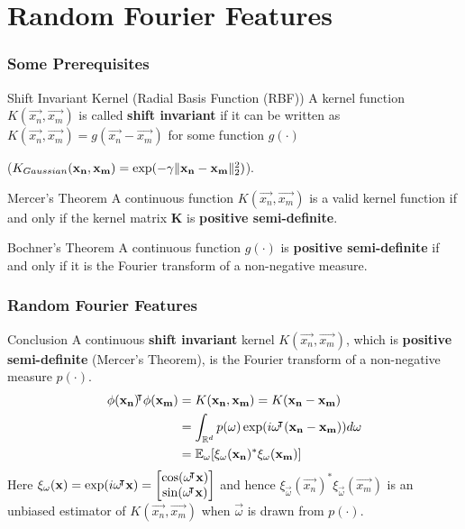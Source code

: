 \documentclass[10pt]{../formats/RU}
\begin{document}
\section{Random Fourier Features}
\begin{frame}
\frametitle{Some Prerequisites}
\begin{alertblock}{Shift Invariant Kernel (Radial Basis Function (RBF))}
  A kernel function $K(\vec{x_n}, \vec{x_m})$ is called \textbf{shift invariant} if it can be written as $K(\vec{x_n}, \vec{x_m}) = g(\vec{x_n}-\vec{x_m})$ for some function $g(\cdot)$

  (\eg $K_{Gaussian}(\mathbf{x_n},\mathbf{x_m})=\exp(-\gamma\lVert\mathbf{x_n}-\mathbf{x_m}\rVert_2^2)$).
\end{alertblock}
\begin{block}{Mercer’s Theorem}
  A continuous function $K(\vec{x_n}, \vec{x_m})$ is a valid kernel function if and only if the kernel matrix $\mathbf{K}$ is \textbf{positive semi-definite}.
\end{block}
\begin{block}{Bochner's Theorem}
  A continuous function $g(\cdot)$ is \textbf{positive semi-definite} if and only if it is the Fourier transform of a non-negative measure.
\end{block}
\end{frame}
\begin{frame}
  \frametitle{Random Fourier Features}
  \begin{exampleblock}{Conclusion}
    A continuous \textbf{shift invariant} kernel $K(\vec{x_n}, \vec{x_m})$, which is \textbf{positive semi-definite} (Mercer's Theorem), is the Fourier transform of a non-negative measure $p(\cdot)$.
    \begin{align}
      \phi(\vec{x_n})\trn\phi(\vec{x_m})
      &= K(\vec{x_n}, \vec{x_m}) = K(\vec{x_n}-\vec{x_m}) \\
      &=\int_{\R^d}p(\vec{\omega})\exp(i\vec{\omega}\trn(\vec{x_n}-\vec{x_m}))d\vec{\omega} \\
      &= \mathbb{E}_{\vec{\omega}}\bracks*{\xi_{\vec{\omega}}(\vec{x_n})^*\xi_{\vec{\omega}}(\vec{x_m})}\label{rffinC}
    \end{align}
    Here
    $
    \xi_{\mathbf{\omega}}(\mathbf{x})=\exp(i\mathbf{\omega}{}^{\mkern-4mu\intercal}\mathbf{x})
    ={
      \begin{bmatrix}
        \cos(\mathbf{\omega}{}^{\mkern-4mu\intercal}\mathbf{x}) \\
        \sin(\mathbf{\omega}{}^{\mkern-4mu\intercal}\mathbf{x})
      \end{bmatrix}
    }
    $
    and hence $\xi_{\vec{\omega}}(\vec{x_n})^*\xi_{\vec{\omega}}(\vec{x_m})$ is an unbiased estimator of $K(\vec{x_n}, \vec{x_m})$ when $\vec{\omega}$ is drawn from $p(\cdot)$.
  \end{exampleblock}
\end{frame}
\end{document}
